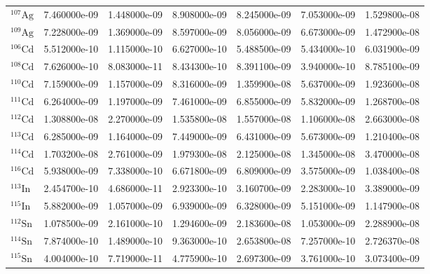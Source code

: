 \begin{tabular}{lrrrrrr}
$^{107}\mathrm{Ag}$ &       7.460000e-09 &      1.448000e-09 &      8.908000e-09 &       8.245000e-09 &      7.053000e-09 &      1.529800e-08 \\
$^{109}\mathrm{Ag}$ &       7.228000e-09 &      1.369000e-09 &      8.597000e-09 &       8.056000e-09 &      6.673000e-09 &      1.472900e-08 \\
$^{106}\mathrm{Cd}$ &       5.512000e-10 &      1.115000e-10 &      6.627000e-10 &       5.488500e-09 &      5.434000e-10 &      6.031900e-09 \\
$^{108}\mathrm{Cd}$ &       7.626000e-10 &      8.083000e-11 &      8.434300e-10 &       8.391100e-09 &      3.940000e-10 &      8.785100e-09 \\
$^{110}\mathrm{Cd}$ &       7.159000e-09 &      1.157000e-09 &      8.316000e-09 &       1.359900e-08 &      5.637000e-09 &      1.923600e-08 \\
$^{111}\mathrm{Cd}$ &       6.264000e-09 &      1.197000e-09 &      7.461000e-09 &       6.855000e-09 &      5.832000e-09 &      1.268700e-08 \\
$^{112}\mathrm{Cd}$ &       1.308800e-08 &      2.270000e-09 &      1.535800e-08 &       1.557000e-08 &      1.106000e-08 &      2.663000e-08 \\
$^{113}\mathrm{Cd}$ &       6.285000e-09 &      1.164000e-09 &      7.449000e-09 &       6.431000e-09 &      5.673000e-09 &      1.210400e-08 \\
$^{114}\mathrm{Cd}$ &       1.703200e-08 &      2.761000e-09 &      1.979300e-08 &       2.125000e-08 &      1.345000e-08 &      3.470000e-08 \\
$^{116}\mathrm{Cd}$ &       5.938000e-09 &      7.338000e-10 &      6.671800e-09 &       6.809000e-09 &      3.575000e-09 &      1.038400e-08 \\
$^{113}\mathrm{In}$ &       2.454700e-10 &      4.686000e-11 &      2.923300e-10 &       3.160700e-09 &      2.283000e-10 &      3.389000e-09 \\
$^{115}\mathrm{In}$ &       5.882000e-09 &      1.057000e-09 &      6.939000e-09 &       6.328000e-09 &      5.151000e-09 &      1.147900e-08 \\
$^{112}\mathrm{Sn}$ &       1.078500e-09 &      2.161000e-10 &      1.294600e-09 &       2.183600e-08 &      1.053000e-09 &      2.288900e-08 \\
$^{114}\mathrm{Sn}$ &       7.874000e-10 &      1.489000e-10 &      9.363000e-10 &       2.653800e-08 &      7.257000e-10 &      2.726370e-08 \\
$^{115}\mathrm{Sn}$ &       4.004000e-10 &      7.719000e-11 &      4.775900e-10 &       2.697300e-09 &      3.761000e-10 &      3.073400e-09 \\

\end{tabular}
